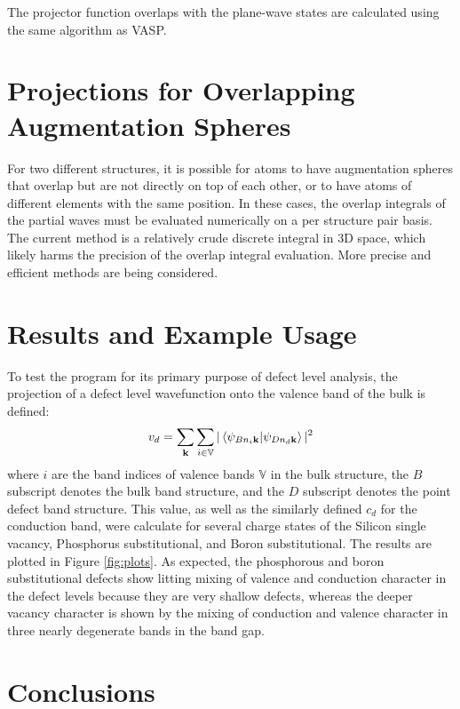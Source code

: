 \documentclass[12pt]{article}
\begin{document}
The projector function overlaps with the plane-wave states are calculated using the same
algorithm as VASP.\cite{vasp,vasp2,vasp3,vasp4}

\section{Projections for Overlapping Augmentation Spheres}

For two different structures, it is possible for atoms to have augmentation spheres
that overlap but are not directly on top of each other, or to have atoms of different elements
with the same position. In these cases, the overlap integrals of the partial waves
must be evaluated numerically on a per structure pair basis. The current method is a relatively
crude discrete integral in 3D space, which likely harms the precision of the overlap integral evaluation.
More precise and efficient methods are being considered.

\section{Results and Example Usage}

To test the program for its primary purpose of defect level analysis, the projection
of a defect level wavefunction onto the valence band of the bulk is defined:
\begin{equation}
v_d=\sum_{\mathbf{k}}\sum_{i\in \mathbb{V}}|\braket{\psi_{Bn_i\mathbf{k}}|\psi_{Dn_d\mathbf{k}}}|^2
\label{eq:vproj}
\end{equation}
where $i$ are the band indices of valence bands $\mathbb{V}$ in the bulk structure, the $B$
subscript denotes the bulk band structure, and the $D$ subscript denotes the point defect
band structure. This value, as well as the similarly defined $c_d$ for the conduction band,
were calculate for several charge states of the Silicon single vacancy, Phosphorus substitutional,
and Boron substitutional. The results are plotted in Figure \ref{fig:plots}.
As expected, the phosphorous and boron substitutional defects show litting mixing
of valence and conduction character in the defect levels because they are very shallow
defects, whereas the deeper vacancy character is shown by the mixing of conduction
and valence character in three nearly degenerate bands in the band gap.

\section{Conclusions}
\end{document}
